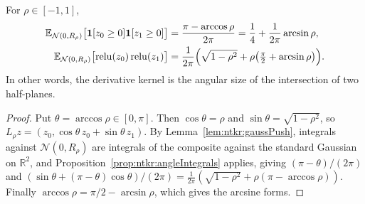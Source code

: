 \begin{proposition}\label{prop:ntkr:standardized}
  \leanok
For $\rho\in[-1,1]$,
\begin{align*}
  \mathbb E_{\mathcal N(0,R_\rho)}\bigl[\mathbf 1[z_0\ge0]\mathbf 1[z_1\ge0]\bigr]
    &=\frac{\pi-\arccos\rho}{2\pi}=\frac14+\frac{1}{2\pi}\arcsin\rho,\\
  \mathbb E_{\mathcal N(0,R_\rho)}\bigl[\operatorname{relu}(z_0)\operatorname{relu}(z_1)\bigr]
    &=\frac1{2\pi}\Bigl(\sqrt{1-\rho^2}+\rho\bigl(\tfrac\pi2+\arcsin\rho\bigr)\Bigr).
\end{align*}
In other words, the derivative kernel is the angular size of the intersection of two half-planes.
\end{proposition}

\begin{proof}
  \leanok
Put $\theta=\arccos\rho\in[0,\pi]$. Then $\cos\theta=\rho$ and $\sin\theta=\sqrt{1-\rho^2}$, so
$L_\rho z=(z_0,\cos\theta\,z_0+\sin\theta\,z_1)$. By Lemma~\ref{lem:ntkr:gaussPush}, integrals against
$\mathcal N(0,R_\rho)$ are integrals of the composite against the standard Gaussian on $\mathbb R^2$, and
Proposition~\ref{prop:ntkr:angleIntegrals} applies, giving $(\pi-\theta)/(2\pi)$ and
$(\sin\theta+(\pi-\theta)\cos\theta)/(2\pi)=\frac1{2\pi}(\sqrt{1-\rho^2}+\rho(\pi-\arccos\rho))$. Finally
$\arccos\rho=\pi/2-\arcsin\rho$, which gives the arcsine forms.
\end{proof}

